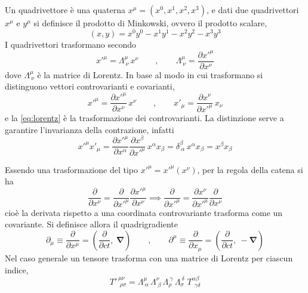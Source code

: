 Un quadrivettore è una quaterna $x^\mu = (x^0, x^1, x^2, x^3)$, e dati due quadrivettori $x^\mu$ e $y^\mu$ si definisce il prodotto di Minkowski, ovvero il prodotto scalare,
%
\begin{equation}
    (x,y) = x^0 y^0 - x^1 y^1 - x^2 y^2 - x^3 y^3
    \label{eq:minkowski}
\end{equation}
I quadrivettori trasformano secondo
%
\begin{equation}
    x'^\mu = \Lambda^\mu_{\ \nu}\, x^\nu \qquad , \qquad \Lambda^\mu_{\ \nu} = \frac{\partial x'^\mu}{\partial x^\nu}
    \label{eq:lorentz}
\end{equation}
dove $\Lambda^\mu_{\ \nu}$ è la matrice di Lorentz. In base al modo in cui trasformano si distinguono vettori controvarianti e covarianti,
%
\begin{equation}
    x'^\mu = \frac{\partial x'^\mu}{\partial x^\nu}\,x^\nu \qquad , \qquad x'_\mu = \frac{\partial x^\nu}{\partial x'^\mu}\,x_\nu
    \label{eq:cov_contro}
\end{equation}
e la \eqref{eq:lorentz} è la trasformazione dei controvarianti. La distinzione serve a garantire l'invarianza della contrazione, infatti
%
\begin{equation*}
    x'^\mu x'_\mu = \frac{\partial x'^\mu}{\partial x^\alpha}\frac{\partial x^\beta}{\partial x'^\mu}\,x^\alpha x_\beta = \delta^\beta_{\ \alpha}\,x^\alpha x_\beta = x^\beta x_\beta
\end{equation*}

Essendo una trasformazione del tipo $x'^\mu = x'^\mu(x^\nu)$, per la regola della catena si ha
%
\begin{equation*}
    \frac{\partial}{\partial x^\nu} = \frac{\partial}{\partial x'^\mu}\frac{\partial x'^\mu}{\partial x^\nu} \implies \frac{\partial}{\partial x'^\mu} = \frac{\partial x^\nu}{\partial x'^\mu}\frac{\partial}{\partial x^\nu}
\end{equation*}
cioè la derivata rispetto a una coordinata controvariante trasforma come un covariante. Si definisce allora il quadrigradiente
%
\begin{equation}
    \partial_\mu \equiv \frac{\partial}{\partial x^\mu} = \left(\frac{\partial}{\partial ct},\ \boldsymbol{\nabla}\right) \qquad , \qquad \partial^\mu \equiv \frac{\partial}{\partial x_\mu} = \left(\frac{\partial}{\partial ct},\ -\boldsymbol{\nabla}\right)
    \label{eq:quadrigradiente}
\end{equation}
Nel caso generale un tensore trasforma con una matrice di Lorentz per ciascun indice,
%
\begin{equation}
    T'^{\,\mu\nu}_{\ \ \rho\sigma} = \Lambda^\mu_{\ \alpha}\,\Lambda^\nu_{\ \beta}\,\Lambda^{\ \gamma}_{\rho}\,\Lambda^{\ \delta}_{\sigma}\; T^{\alpha\beta}_{\ \ \gamma\delta}
    \label{eq:tensore_generale}
\end{equation}

